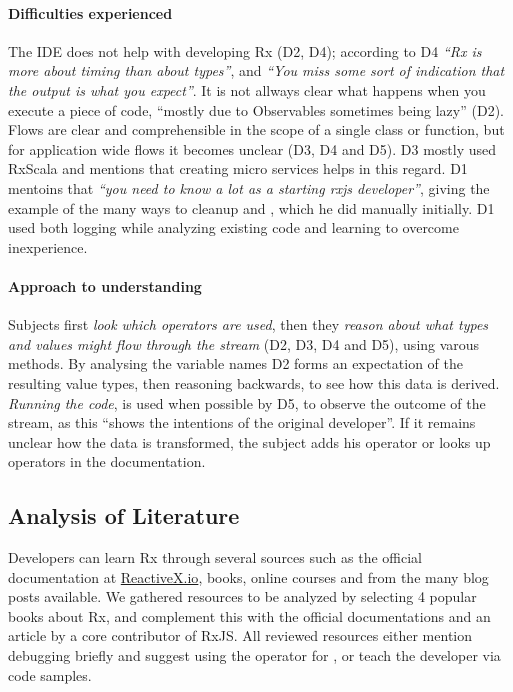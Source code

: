 \paragraph{Difficulties experienced}
The IDE does not help with developing Rx (D2, D4); according to D4 \emph{``Rx is more about timing than about types''}, and \emph{``You miss some sort of indication that the output is what you expect''}. It is not allways clear what happens when you execute a piece of code, ``mostly due to Observables sometimes being lazy'' (D2).
Flows are clear and comprehensible in the scope of a single class or function, but for application wide flows it becomes unclear (D3, D4 and D5). D3 mostly used RxScala and mentions that creating micro services helps in this regard.
D1 mentoins that \emph{``you need to know a lot as a starting {\lbrack}rxjs{\rbrack} developer''}, giving the example of the many ways to cleanup and , which he did manually initially. D1 used both logging while analyzing existing code and learning to overcome inexperience.

\paragraph{Approach to understanding}
Subjects first \emph{look which operators are used},
then they \emph{reason about what types and values might flow through the stream} (D2, D3, D4 and D5), using varous methods.
By analysing the variable names D2 forms an expectation of the resulting value types, then reasoning backwards, to see how this data is derived.
\emph{Running the code}, is used when possible by D5, to observe the outcome of the stream, as this ``shows the intentions of the original developer''.
If it remains unclear how the data is transformed, the subject adds his  operator or looks up operators in the documentation.  

\subsection{Analysis of Literature}
Developers can learn Rx through several sources such as the official documentation at \href{http://reactivex.io}{ReactiveX.io}, books, online courses and from the many blog posts available. We gathered resources to be analyzed by selecting 4 popular books about Rx, and complement this with the official documentations and an article by a core contributor of RxJS.
All reviewed resources either mention debugging briefly and suggest using the  operator for \printfdebugging{}, or teach the developer \printfdebugging{} via code samples. 

